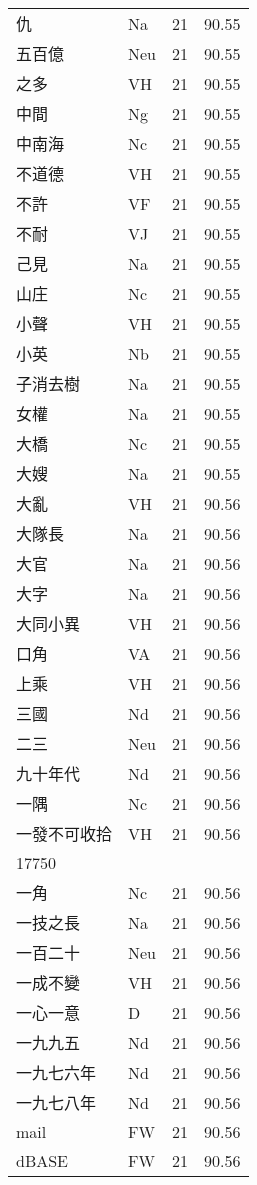 \documentclass[twocolumn]{book}
\begin{document}
\begin{supertabular}{llrr}
仇 & Na & 21 &  90.55\\
五百億 & Neu & 21 &  90.55\\
之多 & VH & 21 &  90.55\\
中間 & Ng & 21 &  90.55\\
中南海 & Nc & 21 &  90.55\\
不道德 & VH & 21 &  90.55\\
不許 & VF & 21 &  90.55\\
不耐 & VJ & 21 &  90.55\\
己見 & Na & 21 &  90.55\\
山庄 & Nc & 21 &  90.55\\
小聲 & VH & 21 &  90.55\\
小英 & Nb & 21 &  90.55\\
子消去樹 & Na & 21 &  90.55\\
女權 & Na & 21 &  90.55\\
大橋 & Nc & 21 &  90.55\\
大嫂 & Na & 21 &  90.55\\
大亂 & VH & 21 &  90.56\\
大隊長 & Na & 21 &  90.56\\
大官 & Na & 21 &  90.56\\
大字 & Na & 21 &  90.56\\
大同小異 & VH & 21 &  90.56\\
口角 & VA & 21 &  90.56\\
上乘 & VH & 21 &  90.56\\
三國 & Nd & 21 &  90.56\\
二三 & Neu & 21 &  90.56\\
九十年代 & Nd & 21 &  90.56\\
一隅 & Nc & 21 &  90.56\\
一發不可收拾 & VH & 21 &  90.56\\
17750\\
一角 & Nc & 21 &  90.56\\
一技之長 & Na & 21 &  90.56\\
一百二十 & Neu & 21 &  90.56\\
一成不變 & VH & 21 &  90.56\\
一心一意 & D & 21 &  90.56\\
一九九五 & Nd & 21 &  90.56\\
一九七六年 & Nd & 21 &  90.56\\
一九七八年 & Nd & 21 &  90.56\\
mail & FW & 21 &  90.56\\
dBASE & FW & 21 &  90.56\\

\end{supertabular}
\end{document}
